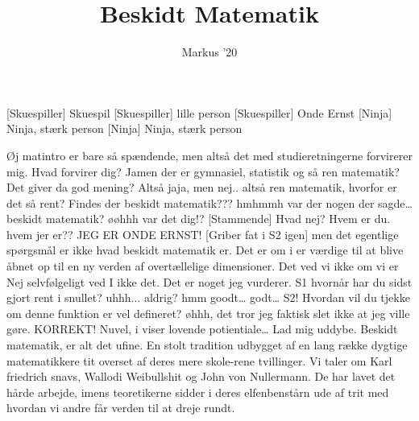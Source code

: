 \documentclass[a4paper,11pt]{article}
\title{Beskidt Matematik}
\author{Markus '20}
\begin{document}
\maketitle

\begin{roles}
[Skuespiller] Skuespil
[Skuespiller] lille person
[Skuespiller] Onde Ernst
[Ninja] Ninja, stærk person
[Ninja] Ninja, stærk person
\end{roles}

\begin{sketch}

 Øj matintro er bare så spændende, men altså det med studieretningerne forvirerer mig.
 Hvad forvirer dig?
Jamen der er gymnasiel, statistik og så ren matematik?
 Det giver da god mening?
 Altså jaja, men nej.. altså ren matematik, hvorfor er det så rent? Findes der beskidt matematik???
 hmhmmh var der nogen der sagde… beskidt matematik?
 øøhhh
 var det dig!?
 
[Stammende] Hvad nej? Hvem er du.
 hvem jer er?? 
 JEG ER ONDE ERNST!
[Griber fat i S2 igen] men det egentlige spørgsmål er ikke hvad beskidt matematik er. Det er om i er værdige til at blive åbnet op til en ny verden af overtællelige dimensioner.
 
 
 Det ved vi ikke om vi er
 Nej selvfølgeligt ved I ikke det. Det er noget jeg vurderer.
 S1 hvornår har du sidst gjort rent i snullet?
 uhhh... aldrig?
 hmm goodt… godt… S2! Hvordan vil du tjekke om denne funktion er vel defineret? 
 øhhh, det tror jeg faktisk slet ikke at jeg ville gøre.
 KORREKT!
 Nuvel, i viser lovende potientiale… Lad mig uddybe. Beskidt matematik, er alt det ufine. En stolt tradition udbygget af en lang række dygtige matematikkere tit overset af deres mere skole-rene tvillinger. Vi taler om Karl friedrich snavs, Wallodi Weibullshit og John von Nullermann. De har lavet det hårde arbejde, imens teoretikerne sidder i deres elfenbenstårn ude af trit med hvordan vi andre får verden til at dreje rundt.

\end{sketch}
\end{document}
